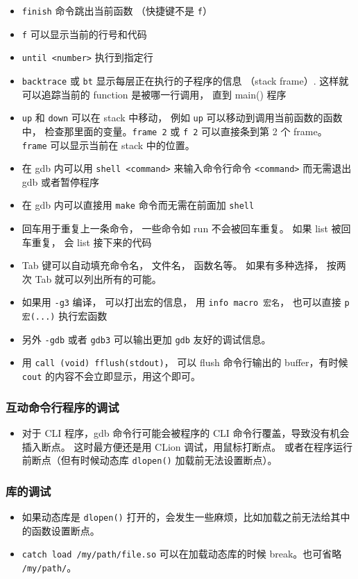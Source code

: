 \begin{itemize}
\item \verb`finish` 命令跳出当前函数 （快捷键不是 \verb`f`）
\item \verb`f` 可以显示当前的行号和代码
\item \verb`until <number>` 执行到指定行
\item \verb`backtrace` 或 \verb`bt` 显示每层正在执行的子程序的信息 （stack frame）. 这样就可以追踪当前的 function 是被哪一行调用， 直到 main() 程序
\item \verb`up` 和 \verb`down` 可以在 stack 中移动， 例如 \verb`up` 可以移动到调用当前函数的函数中， 检查那里面的变量。\verb`frame 2` 或 \verb`f 2` 可以直接条到第 2 个 frame。 \verb`frame` 可以显示当前在 stack 中的位置。
\item 在 gdb 内可以用 \verb`shell <command>` 来输入命令行命令 \verb`<command>` 而无需退出 gdb 或者暂停程序
\item 在 gdb 内可以直接用 \verb`make` 命令而无需在前面加 \verb`shell`
\item 回车用于重复上一条命令， 一些命令如 run 不会被回车重复。 如果 list 被回车重复， 会 list 接下来的代码
\item Tab 键可以自动填充命令名， 文件名， 函数名等。 如果有多种选择， 按两次 Tab 就可以列出所有的可能。
\item 如果用 \verb`-g3` 编译， 可以打出宏的信息， 用 \verb`info macro 宏名`， 也可以直接 \verb`p 宏(...)` 执行宏函数
\item 另外 \verb`-gdb` 或者 \verb`gdb3` 可以输出更加 \verb`gdb` 友好的调试信息。
\item 用 \verb`call (void) fflush(stdout)`， 可以 flush 命令行输出的 buffer，有时候 \verb`cout` 的内容不会立即显示，用这个即可。
\end{itemize}

\subsubsection{互动命令行程序的调试}
\begin{itemize}
\item 对于 CLI 程序，gdb 命令行可能会被程序的 CLI 命令行覆盖，导致没有机会插入断点。 这时最方便还是用 CLion 调试，用鼠标打断点。 或者在程序运行前断点（但有时候动态库 \verb`dlopen()` 加载前无法设置断点）。
\end{itemize}


\subsubsection{库的调试}
\begin{itemize}
\item 如果动态库是 \verb`dlopen()` 打开的，会发生一些麻烦，比如加载之前无法给其中的函数设置断点。
\item \verb`catch load /my/path/file.so` 可以在加载动态库的时候 break。也可省略 \verb`/my/path/`。
\end{itemize}

